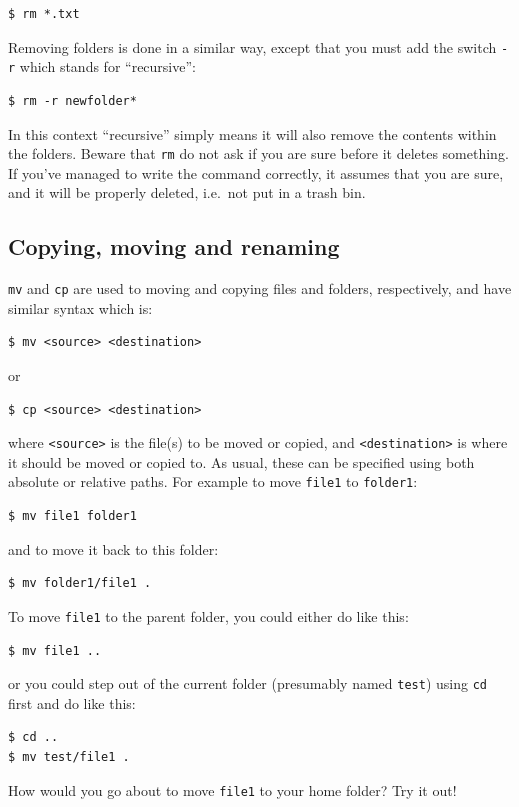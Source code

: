 \begin{verbatim}
$ rm *.txt
\end{verbatim}

Removing folders is done in a similar way, except that you must add the switch \verb|-r| which stands for ``recursive'':

\begin{verbatim}
$ rm -r newfolder*
\end{verbatim}
In this context ``recursive'' simply means it will also remove the contents within the folders. Beware that \verb$rm$ do not ask if you are sure before it deletes something. If you've managed to write the command correctly, it assumes that you are sure, and it will be properly deleted, i.e.\ not put in a trash bin.

\subsection{Copying, moving and renaming}
\verb|mv| and \verb|cp| are used to moving and copying files and folders, respectively, and have similar syntax which is:

\begin{verbatim}
$ mv <source> <destination>
\end{verbatim}
or
\begin{verbatim}
$ cp <source> <destination>
\end{verbatim}
where \verb|<source>| is the file(s) to be moved or copied, and \verb|<destination>| is where it should be moved or copied to. As usual, these can be specified using both absolute or relative paths. For example to move \verb|file1| to \verb|folder1|:

\begin{verbatim}
$ mv file1 folder1
\end{verbatim}
and to move it back to this folder:

\begin{verbatim}
$ mv folder1/file1 .
\end{verbatim}

To move \verb|file1| to the parent folder, you could either do like this:
\begin{verbatim}
$ mv file1 ..
\end{verbatim}
or you could step out of the current folder (presumably named \verb|test|) using \verb|cd| first and do like this:
\begin{verbatim}
$ cd ..
$ mv test/file1 .
\end{verbatim}
How would you go about to move \verb|file1| to your home folder? Try it out!

